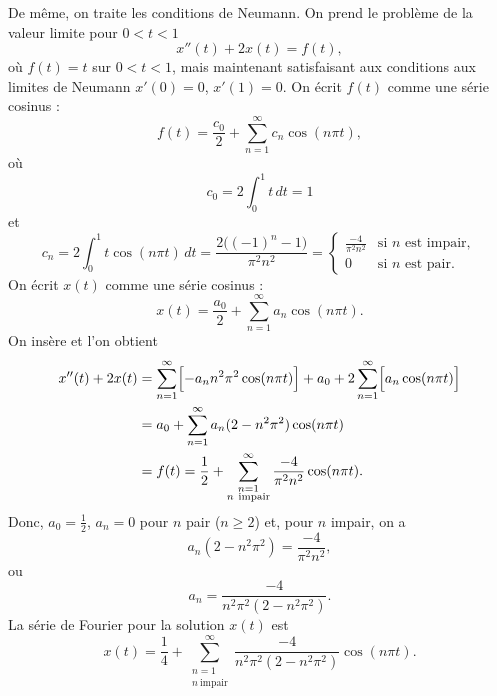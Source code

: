 \begin{example}
De même, on traite les conditions de Neumann.
On prend le problème de la valeur limite pour $0 < t < 1$
\begin{equation*}
x''(t) + 2 x(t) = f(t) ,
\end{equation*}
où $f(t) = t$ sur $0 < t < 1$, mais maintenant satisfaisant aux conditions aux limites de Neumann
$x'(0) = 0$, $x'(1)=0$.
On écrit $f(t)$ comme une série cosinus :
\begin{equation*}
f(t) = \frac{c_0}{2} + \sum_{n=1}^\infty c_n \cos (n \pi t) ,
\end{equation*}
où
\begin{equation*}
c_0 = 2 \int_0^1 t \,dt = 1
\end{equation*}
et
\begin{equation*}
c_n = 2 \int_0^1 t \cos (n \pi t) \,dt =
\frac{2\bigl({(-1)}^n-1\bigr)}{\pi^2 n^2} = 
\begin{cases}
\frac{-4}{\pi^2 n^2} & \text{si } n \text{ est impair} , \\
0 & \text{si } n \text{ est pair}.
\end{cases}
\end{equation*}
On écrit $x(t)$ comme une série cosinus :
\begin{equation*}
x(t) = \frac{a_0}{2} + \sum_{n=1}^\infty a_n \cos (n \pi t) .
\end{equation*}
On insère et l'on obtient
\begin{equation*}
\begin{split}
x''(t) + 2 x(t) & =
\sum_{n=1}^\infty \Bigl[ - a_n n^2 \pi^2 \cos (n \pi t) \Bigr]
+
a_0 +
2
\sum_{n=1}^\infty \Bigl[ a_n \cos (n \pi t) \Bigr]
\\
& =
a_0 +
\sum_{n=1}^\infty a_n (2 - n^2 \pi^2 ) \cos (n \pi t)
\\
& = f(t)
=
\frac{1}{2} +
\sum_{\substack{n=1\\n~\text{impair}}}^\infty
\frac{-4}{\pi^2 n^2} \cos (n \pi t) .
\end{split}
\end{equation*}
Donc, $a_0 = \frac{1}{2}$, $a_n = 0$ pour $n$ pair ($n \geq 2$) et, pour
$n$ impair, on a
\begin{equation*}
a_n (2 - n^2 \pi^2)
=
\frac{-4}{\pi^2 n^2} ,
\end{equation*}
ou
\begin{equation*}
a_n
=
\frac{-4}{n^2 \pi^2 (2 - n^2 \pi^2)} .
\end{equation*}
La série de Fourier pour la solution $x(t)$ est
\begin{equation*}
x(t) = 
\frac{1}{4} +
\sum_{\substack{n=1\\n~\text{impair}}}^\infty
\frac{-4}{n^2 \pi^2 (2 - n^2 \pi^2)} 
\cos (n \pi t) .
\end{equation*}
\end{example}

